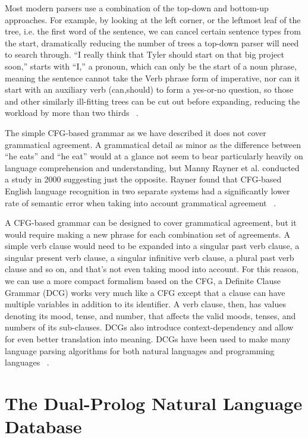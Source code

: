 \documentclass[12pt]{article}
\begin{document}
Most modern parsers use a combination of the top-down and bottom-up approaches. For example, by looking at the left corner, or the leftmost leaf of the tree, i.e. the first word of the sentence, we can cancel certain sentence types from the start, dramatically reducing the number of trees a top-down parser will need to search through. ``I really think that Tyler should start on that big project soon,'' starts with ``I,'' a pronoun, which can only be the start of a noun phrase, meaning the sentence cannot take the Verb phrase form of imperative, nor can it start with an auxiliary verb (can,should) to form a yes-or-no question, so those and other similarly ill-fitting trees can be cut out before expanding, reducing the workload by more than two thirds ~\citep{Jurafsky}.

The simple CFG-based grammar as we have described it does not cover grammatical agreement. A grammatical detail as minor as the difference between ``he eats'' and ``he eat'' would at a glance not seem to bear particularly heavily on language comprehension and understanding, but Manny Rayner et al. conducted a study in 2000 suggesting just the opposite. Rayner found that CFG-based English language recognition in two separate systems had a significantly lower rate of semantic error when taking into account grammatical agreement ~\citep{Rayner}.

A CFG-based grammar can be designed to cover grammatical agreement, but it would require making a new phrase for each combination set of agreements. A simple verb clause would need to be expanded into a singular past verb clause, a singular present verb clause, a singular infinitive verb clause, a plural past verb clause and so on, and that's not even taking mood into account. For this reason, we can use a more compact formalism based on the CFG, a Definite Clause Grammar (DCG) works very much like a CFG except that a clause can have multiple variables in addition to its identifier. A verb clause, then, has values denoting its mood, tense, and number, that affects the valid moods, tenses, and numbers of its sub-clauses. DCGs also introduce context-dependency and allow for even better translation into meaning. DCGs have been used to make many language parsing algorithms for both natural languages and programming languages ~\citep{DCGNLA}.

\section*{The Dual-Prolog Natural Language Database}
\end{document}
